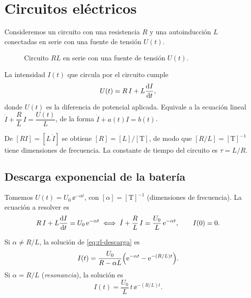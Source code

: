 \section{Circuitos eléctricos}

Consideremos un circuito con una resistencia $R$ y una autoinducción $L$ conectadas en serie con una fuente de tensión $U(t)$.

\begin{figure}[H]
  \centering
  \caption{Circuito $RL$ en serie con una fuente de tensión $U(t)$.}
  \label{fig:circuito}
\end{figure}

\begin{modelo}
La intensidad $I(t)$ que circula por el circuito cumple
\begin{equation}
  U(t)=R\,I+L\dfrac{\mathrm{d} I}{\mathrm{d} t},
  \label{eq:kirchhoff}
\end{equation}
donde $U(t)$ es la diferencia de potencial aplicada. Equivale a la ecuación lineal $\dot I+\dfrac RL\,I=\dfrac{U(t)}{L}$, de la forma $\dot I+a(t)I=b(t)$.
\end{modelo}

\begin{remark}
De $[RI]=[L\,\dot I]$ se obtiene $[R]=[L]/[\mathrm T]$, de modo que $[R/L]=[\mathrm T]^{-1}$ tiene dimensiones de frecuencia. La constante de tiempo del circuito es $\tau=L/R$.
\end{remark}

\subsection*{Descarga exponencial de la batería}

Tomemos $U(t)=U_0\,\ee^{-\alpha t}$, con $[\alpha]=[\mathrm T]^{-1}$ (dimensiones de frecuencia). La ecuación a resolver es
\begin{equation}
  R\,I+L\dfrac{\mathrm{d} I}{\mathrm{d} t}=U_0\,\mathrm{e}^{-\alpha t}
  \;\Longleftrightarrow\;
  \dot I+\frac RL\,I=\frac{U_0}{L}\,\mathrm{e}^{-\alpha t},
  \qquad I(0)=0 .
  \label{eq:rl-descarga}
\end{equation}

\begin{proposition}\label{prop:rl}
Si $\alpha\neq R/L$, la solución de \eqref{eq:rl-descarga} es
\begin{equation}
  I(t)=\frac{U_0}{R-\alpha L}\Bigl(\mathrm{e}^{-\alpha t}-\mathrm{e}^{-(R/L)t}\Bigr).
  \label{eq:rl-sol}
\end{equation}
Si $\alpha=R/L$ (\emph{resonancia}), la solución es
\begin{equation}
  I(t)=\frac{U_0}{L}\,t\,\ee^{-(R/L)t}.
  \label{eq:rl-resonancia}
\end{equation}
\end{proposition}

